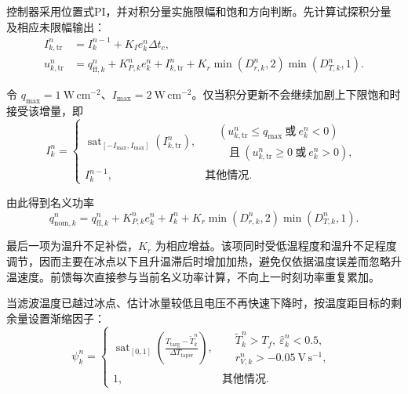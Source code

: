 \documentclass[bwprint]{gmcmthesis}
\numberwithin{figure}{section}
\begin{document}
控制器采用位置式PI，并对积分量实施限幅和饱和方向判断。先计算试探积分量及相应未限幅输出：
\begin{equation}
\begin{aligned}
I_{k,\mathrm{tr}}^n&=I_k^{n-1}+K_Ie_k^n\Delta t_c,\\
u_{k,\mathrm{tr}}^n&=q_{\mathrm{ff},k}^n+K_{P,k}^ne_k^n+I_{k,\mathrm{tr}}^n
+K_r\min(D_{r,k}^n,2)\min(D_{T,k}^n,1).
\end{aligned}
\tag{7-21}\label{eq:q4:trial_integral}
\end{equation}

令 $q_{\max}=1\ \mathrm{W\,cm^{-2}}$、$I_{\max}=2\ \mathrm{W\,cm^{-2}}$。仅当积分更新不会继续加剧上下限饱和时接受该增量，即
\begin{equation}
I_k^n=\begin{cases}
\operatorname{sat}_{[-I_{\max},I_{\max}]}(I_{k,\mathrm{tr}}^n),
& \begin{aligned}
&(u_{k,\mathrm{tr}}^n\leq q_{\max}\ \text{或}\ e_k^n<0)\\[-2pt]
&\quad\text{且}\ (u_{k,\mathrm{tr}}^n\geq0\ \text{或}\ e_k^n>0),
\end{aligned}\\
I_k^{n-1}, & \text{其他情况}.
\end{cases}
\tag{7-22}\label{eq:q4:antiwindup}
\end{equation}

由此得到名义功率
\begin{equation}
q_{\mathrm{nom},k}^n=q_{\mathrm{ff},k}^n+K_{P,k}^ne_k^n+I_k^n
+K_r\min(D_{r,k}^n,2)\min(D_{T,k}^n,1).
\tag{7-23}\label{eq:q4:nominal_power}
\end{equation}

最后一项为温升不足补偿，$K_r$ 为相应增益。该项同时受低温程度和温升不足程度调节，因而主要在冰点以下且升温滞后时增加加热，避免仅依据温度误差而忽略升温速度。前馈每次直接参与当前名义功率计算，不向上一时刻功率重复累加。

当滤波温度已越过冰点、估计冰量较低且电压不再快速下降时，按温度距目标的剩余量设置渐缩因子：
\begin{equation}
\psi_k^n=\begin{cases}
\displaystyle\operatorname{sat}_{[0,1]}\!\left(
\frac{T_{\mathrm{targ}}-\widetilde T_k^n}{\Delta T_{\mathrm{taper}}}\right),
&\begin{aligned}
&\widetilde T_k^n>T_f,\ \widehat\varepsilon_k^n<0.5,\\[-2pt]
&r_{V,k}^n>-0.05\ \mathrm{V\,s^{-1}},
\end{aligned}\\
1, &\text{其他情况}.
\end{cases}
\tag{7-24}\label{eq:q4:taper_factor}
\end{equation}
\end{document}

